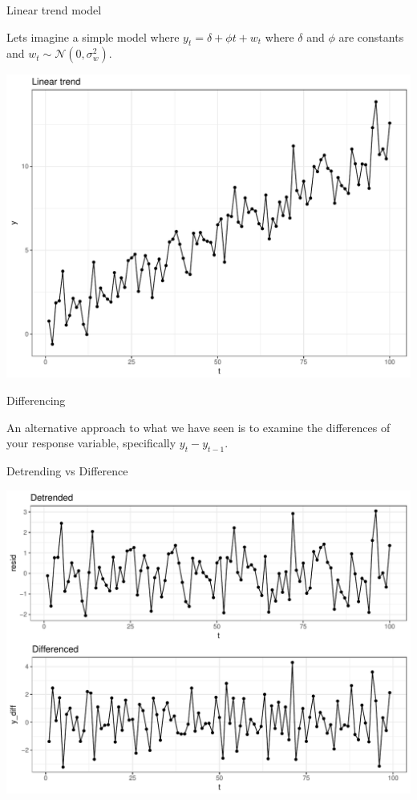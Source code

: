 \documentclass[11pt,ignorenonframetext,]{beamer}
\begin{document}
\begin{frame}{Linear trend model}

Lets imagine a simple model where \(y_t = \delta + \phi t + w_t\) where
\(\delta\) and \(\phi\) are constants and
\(w_t \sim \mathcal{N}(0,\sigma^2_w)\).

\includegraphics{Lec7_files/figure-beamer/unnamed-chunk-14-1.pdf}

\end{frame}

\begin{frame}[t]{Differencing}

An alternative approach to what we have seen is to examine the
differences of your response variable, specifically \(y_t - y_{t-1}\).

\end{frame}

\begin{frame}{Detrending vs Difference}

\includegraphics{Lec7_files/figure-beamer/unnamed-chunk-15-1.pdf}

\end{frame}
\end{document}
